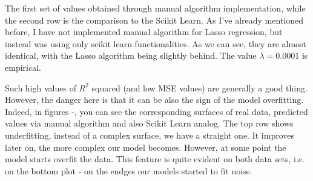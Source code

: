  The first set of values obtained through manual algorithm implementation, while the second row is the comparison to the Scikit Learn. As I've already mentioned before, I have not implemented manual algorithm for Lasso regression, but instead was using only scikit learn functionalities. As we can see, they are almost identical, with the Lasso algorithm being slightly behind. The value $\lambda=0.0001$ is empirical.
 
 Such high values of $R^2$ squared (and low MSE values) are generally a good thing. However, the danger here is that it can be also the sign of the model overfitting. Indeed, in figures -, you can see the corresponding surfaces of real data, predicted values via manual algorithm and also Scikit Learn analog. The top row shows underfitting, instead of a complex surface, we have a straight one. It improves later on, the more complex our model becomes. However, at some point the model starts overfit the data. This feature is quite evident on both data sets, i.e. on the bottom plot - on the endges our models started to fit noise.
 

